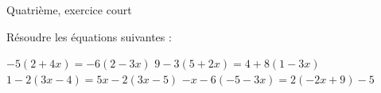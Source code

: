 Quatrième, exercice court

Résoudre les équations suivantes :
\begin{enumerate}
	\li $-5(2 + 4x) = -6(2 - 3x)$
	\li $9 - 3(5 + 2x) = 4 + 8(1 - 3x)$
	\li $1 - 2(3x - 4) = 5x - 2(3x - 5)$
	\li $-x -6(-5 -3x) = 2(-2x + 9) - 5$
\end{enumerate}